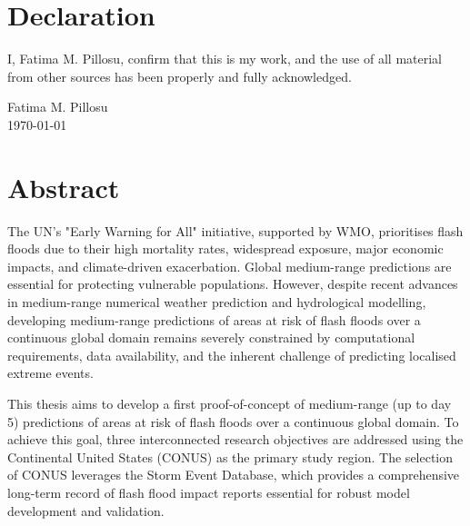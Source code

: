 \documentclass{thesis} %
\begin{document}

\thispagestyle{empty} %

\newpage
\null
\newpage
\setcounter{page}{1} %

\chapter*{\Large Declaration}

I, Fatima M. Pillosu, confirm that this is my work, and the use of all material from other sources has been properly and fully acknowledged. \\[1cm]

\begin{flushright}
Fatima M. Pillosu \\
\today
\end{flushright}

\newpage
\null
\newpage
\setcounter{page}{3} %


\chapter*{\Large Abstract}

The UN's "Early Warning for All" initiative, supported by WMO, prioritises flash floods due to their high mortality rates, widespread exposure, major economic impacts, and climate-driven exacerbation. Global medium-range predictions are essential for protecting vulnerable populations. However, despite recent advances in medium-range numerical weather prediction and hydrological modelling, developing medium-range predictions of areas at risk of flash floods over a continuous global domain remains severely constrained by computational requirements, data availability, and the inherent challenge of predicting localised extreme events.

This thesis aims to develop a first proof-of-concept of medium-range (up to day 5) predictions of areas at risk of flash floods over a continuous global domain. To achieve this goal, three interconnected research objectives are addressed using the Continental United States (CONUS) as the primary study region. The selection of CONUS leverages the Storm Event Database, which provides a comprehensive long-term record of flash flood impact reports essential for robust model development and validation. 
\end{document}
